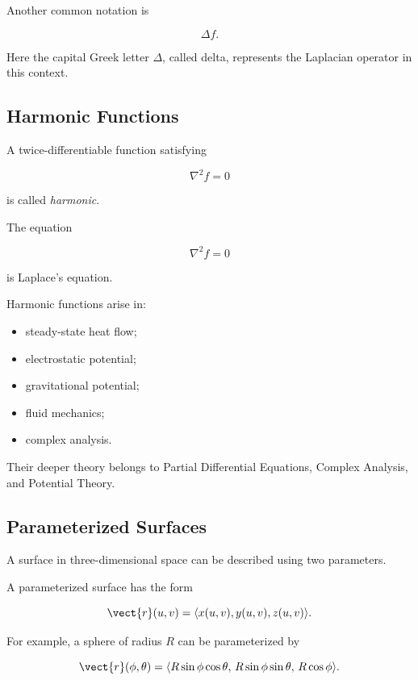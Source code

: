 Another common notation is

\[ \Delta f. \]

Here the capital Greek letter \(\Delta\), called delta, represents the
Laplacian operator in this context.

\subsection{Harmonic Functions}
\label{subsec:harmonic-functions-vector-calculus}

A twice-differentiable function satisfying

\[ \nabla^2f=0 \]

is called \emph{harmonic}.

The equation

\[ \boxed{\nabla^2f=0} \]

is Laplace's equation.

Harmonic functions arise in:

\begin{itemize}
    \item steady-state heat flow;
    \item electrostatic potential;
    \item gravitational potential;
    \item fluid mechanics;
    \item complex analysis.
\end{itemize}

Their deeper theory belongs to Partial Differential Equations, Complex
Analysis, and Potential Theory.

\subsection{Parameterized Surfaces}
\label{subsec:parameterized-surfaces}

A surface in three-dimensional space can be described using two parameters.

A parameterized surface has the form

\[ \vect{r}(u,v)
=
\langle x(u,v),y(u,v),z(u,v)\rangle. \]

For example, a sphere of radius \(R\) can be parameterized by

\[ \vect{r}(\phi,\theta)
=
\langle
R\sin\phi\cos\theta,\,
R\sin\phi\sin\theta,\,
R\cos\phi
\rangle. \]

